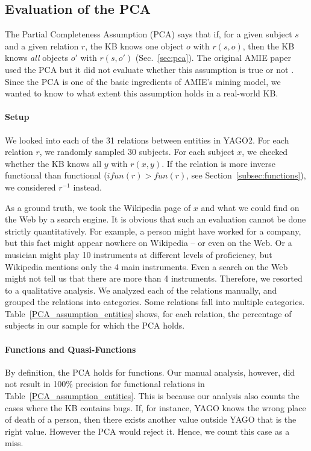 \subsection{Evaluation of the PCA} \label{experimentspca}
The Partial Completeness Assumption (PCA) says that if, for a given subject $s$ and a given relation $r$, the KB knows one object $o$ with $r(s,o)$, then the KB knows \emph{all} objects $o'$ with $r(s,o')$ (Sec.~\ref{sec:pca}). The original AMIE paper used the PCA but it did not evaluate whether this assumption is true or not \cite{amie}.
Since the PCA is one of the basic ingredients of AMIE's mining model,
we wanted to know to what extent this assumption holds in a real-world KB.

\paragraph{Setup} We looked into each of the 31 relations between entities in YAGO2.
For each relation $r$, we randomly sampled 30 subjects.
For each subject $x$, we checked whether the KB knows all $y$ with $r(x,y)$. If the relation is more inverse functional than functional
($ifun(r) > fun(r)$, see Section~\ref{subsec:functions}), we considered $r^{-1}$ instead.

As a ground truth, we took the Wikipedia page of $x$ and what we could find on the Web by a search engine.
It is obvious that such an evaluation cannot be done strictly quantitatively.
For example, a person might have worked for a company, but this fact might appear nowhere on Wikipedia -- or even on the Web.
Or a musician might play 10 instruments at different levels of proficiency, but Wikipedia mentions only the 4 main instruments.
Even a search on the Web might not tell us that there are more than 4 instruments.
Therefore, we resorted to a qualitative analysis.
We analyzed each of the relations manually, and grouped the relations into categories.
Some relations fall into multiple categories.
Table~\ref{PCA_assumption_entities} shows, for each relation, the percentage of subjects in our sample for which the PCA holds.

\paragraph{Functions and Quasi-Functions} By definition, the PCA holds for functions. Our manual analysis, however, did not result in 100\% precision for functional relations in Table~\ref{PCA_assumption_entities}.
This is because our analysis also counts the cases where the KB contains bugs. If, for instance, YAGO knows the wrong place of death of a person, then there exists another value outside YAGO that is the right value. However the PCA would reject it. Hence, we count this case as a miss.

